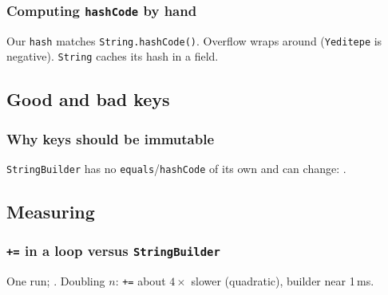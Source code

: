 \documentclass[aspectratio=169,10pt,compress]{beamer}
\begin{document}
\begin{frame}[t,fragile] \frametitle{Computing \texttt{hashCode} by hand}

  \vspace{0.3em}
  \small Our \texttt{hash} matches \texttt{String.hashCode()}. Overflow wraps around (\texttt{Yeditepe} is negative).
  \texttt{String} caches its hash in a field.
\end{frame}

\subsection[Keys]{Good and bad keys}




\begin{frame}[t,fragile] \frametitle{Why keys should be immutable}

  \vspace{0.3em}
  \small \texttt{StringBuilder} has no \texttt{equals}/\texttt{hashCode} of its own and can change: .
\end{frame}





\subsection[Timing]{Measuring}




\begin{frame}[t,fragile] \frametitle{\texttt{+=} in a loop versus \texttt{StringBuilder}}

  \vspace{0.3em}
  \small One run; . Doubling $n$: \texttt{+=} about $4\times$ slower (quadratic), builder near 1\,ms.
\end{frame}
\end{document}

